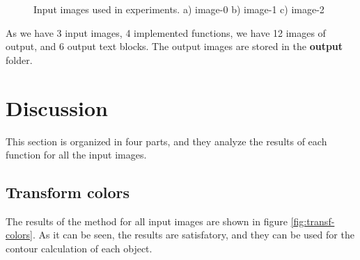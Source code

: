 \documentclass[]{IEEEtran}
\begin{document}
\begin{figure}[]
  \centering
  \caption{Input images used in experiments. a) image-0 b) image-1 c) image-2}
  \label{fig:input-images}
\end{figure}

As we have 3 input images, 4 implemented functions, we have 12 images of output, and 6 output text blocks. The output images are stored in the \textbf{output} folder.

\section{Discussion}
This section is organized in four parts, and they analyze the results of each function for all the input images.

\subsection{Transform colors}
The results of the method for all input images are shown in figure \ref{fig:transf-colors}. As it can be seen, the results are satisfatory, and they can be used for the contour calculation of each object.
\end{document}

